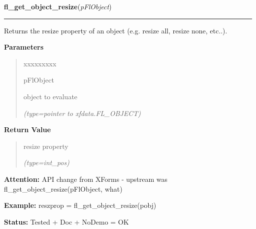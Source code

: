 \hspace{.8\funcindent}\begin{boxedminipage}{\funcwidth}

    \raggedright \textbf{fl\_get\_object\_resize}(\textit{pFlObject})

    \vspace{-1.5ex}

    \rule{\textwidth}{0.5\fboxrule}
\setlength{\parskip}{2ex}
    Returns the resize property of an object (e.g. resize all, resize none,
    etc..).

\setlength{\parskip}{1ex}
      \textbf{Parameters}
      \vspace{-1ex}

      \begin{quote}
        \begin{Ventry}{xxxxxxxxx}

          \item[pFlObject]

          object to evaluate

            {\it (type=pointer to xfdata.FL\_OBJECT)}

        \end{Ventry}

      \end{quote}

      \textbf{Return Value}
    \vspace{-1ex}

      \begin{quote}
      resize property

      {\it (type=int\_pos)}

      \end{quote}

\textbf{Attention:} API change from XForms - upstream was fl\_get\_object\_resize(pFlObject, 
what)



\textbf{Example:} reszprop = fl\_get\_object\_resize(pobj)



\textbf{Status:} Tested + Doc + NoDemo = OK



    \end{boxedminipage}

    \label{xformslib:flbasic:fl_set_object_gravity}

    \vspace{0.5ex}

